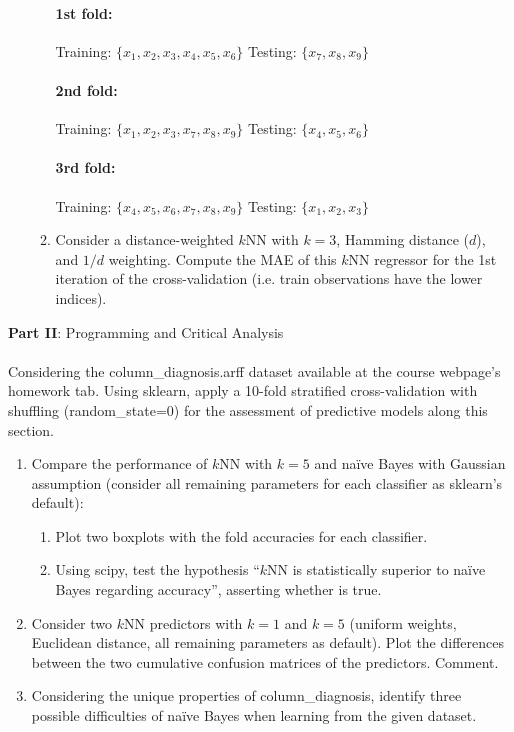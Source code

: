 \documentclass[12pt]{article}
\begin{document}
\begin{enumerate}[leftmargin=\labelsep]
\begin{enumerate}
        \paragraph{1st fold:} Training: $\{x_1, x_2, x_3, x_4, x_5, x_6\}$ Testing: $\{x_7, x_8, x_9\}$
        \paragraph{2nd fold:} Training: $\{x_1, x_2, x_3, x_7, x_8, x_9\}$ Testing: $\{x_4, x_5, x_6\}$
        \paragraph{3rd fold:} Training: $\{x_4, x_5, x_6, x_7, x_8, x_9\}$ Testing: $\{x_1, x_2, x_3\}$
        \item  Consider a distance-weighted $k$NN with $k = 3$, Hamming distance ($d$), and $1/d$ weighting.
        Compute the MAE of this $k$NN regressor for the 1st iteration of the cross-validation (i.e. train
        observations have the lower indices).
    \end{enumerate}
\end{enumerate}

\vskip 1cm

\large{\textbf{Part II}: Programming and Critical Analysis}\normalsize

\paragraph{}Considering the column\_diagnosis.arff dataset available at the course webpage’s homework tab.
Using sklearn, apply a 10-fold stratified cross-validation with shuffling (random\_state=0) for the
assessment of predictive models along this section.

\begin{enumerate}[leftmargin=\labelsep]
    \item Compare the performance of $k$NN with $k = 5$ and naïve Bayes with Gaussian assumption
    (consider all remaining parameters for each classifier as sklearn's default):

    \begin{enumerate}
        \item Plot two boxplots with the fold accuracies for each classifier.
        \item Using scipy, test the hypothesis “$k$NN is statistically superior to naïve Bayes regarding
        accuracy”, asserting whether is true.
    \end{enumerate}

    \item Consider two $k$NN predictors with $k = 1$ and $k = 5$ (uniform weights, Euclidean distance,
    all remaining parameters as default). Plot the differences between the two cumulative confusion
    matrices of the predictors. Comment.

    \item Considering the unique properties of column\_diagnosis, identify three possible difficulties
    of naïve Bayes when learning from the given dataset.
\end{enumerate}
\end{document}
